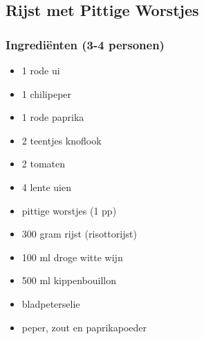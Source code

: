 \subsection{Rijst met Pittige Worstjes}

\subsubsection*{Ingrediënten (3-4 personen)}
\begin{multicols}{2}
    \begin{itemize}
        \item 1 rode ui
        \item 1 chilipeper
        \item 1 rode paprika
        \item 2 teentjes knoflook
        \item 2 tomaten
        \item 4 lente uien
        \item pittige worstjes (1 pp)
        \item 300 gram rijst (risottorijst)
        \item 100 ml droge witte wijn
        \item 500 ml kippenbouillon
        \item bladpeterselie
        \item peper, zout en paprikapoeder
    \end{itemize}
\end{multicols}

